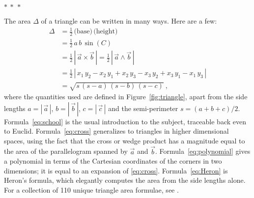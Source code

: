 \documentclass[12pt]{article}
\newcommand{\abs}[1]{|\,{#1}\,|}
\newcommand{\pseudosection}[1]
{}
\begin{document}
\bigskip
{\centering $\ast~\ast~\ast$ \par}
\bigskip

\pseudosection{Areas}
\noindent
The area $\Delta$ of a triangle can be written in many ways.
Here are a few:
\begin{align}
\Delta 
&= \frac{1}{2} \, \text{(base)} \, \text{(height)} \label{eq:school} \\
&= \frac{1}{2}\,a\,b\,\sin(C) \label{eq:sine} \\
&= \frac{1}{2}\, \abs{\vec{a} \times \vec{b}}
    = \frac{1}{2}\, \abs{\vec{a} \wedge \vec{b}}\label{eq:cross} \\
&= \frac{1}{2}\, \abs{
    x_1 \, y_2 - x_2 \, y_1 +
    x_2 \, y_3 - x_3 \, y_2 +
    x_3 \, y_1 - x_1 \, y_3
}\label{eq:polynomial} \\
&= \sqrt{s\,(s-a)\,(s-b)\,(s-c)} \label{eq:Heron} ~,
\end{align}
where the quantities used are defined in Figure~\ref{fig:triangle}, apart from the side lengths
$a = \abs{\vec{a}}$, $b = \abs{\vec{b}}$, $c = \abs{\vec{c}}$
and the semi-perimeter $s = (a + b + c)/2$.
Formula~\eqref{eq:school} is the usual introduction to the subject, traceable back even to Euclid.
Formula~\eqref{eq:cross} generalizes to triangles in higher dimensional spaces, using the fact that the cross or wedge product has a magnitude equal to the area of the parallelogram spanned by $\vec{a}$ and $\vec{b}$.
Formula~\eqref{eq:polynomial} gives a polynomial in terms of the Cartesian coordinates of the corners in two dimensions; it is equal to an expansion of \eqref{eq:cross}.
Formula~\eqref{eq:Heron} is Heron's formula, which elegantly computes the area from the side lengths alone.
For a collection of 110 unique triangle area formulae, see \citet{baker1885a,baker1885b}.
\end{document}
